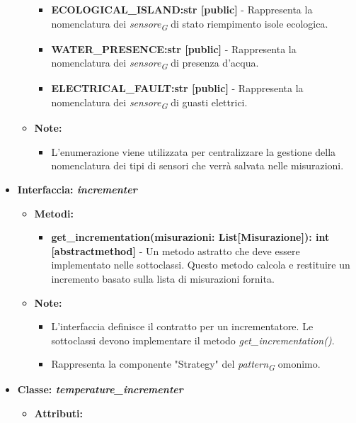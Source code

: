 \begin{itemize}
\begin{itemize}
\begin{itemize}
                \item \textbf{ECOLOGICAL\_ISLAND:str [public]} - Rappresenta la nomenclatura dei \textit{sensore}\textsubscript{\textit{G}} di stato riempimento isole ecologica.
                \item \textbf{WATER\_PRESENCE:str [public]} - Rappresenta la nomenclatura dei \textit{sensore}\textsubscript{\textit{G}} di presenza d'acqua.
                \item \textbf{ELECTRICAL\_FAULT:str [public]} - Rappresenta la nomenclatura dei \textit{sensore}\textsubscript{\textit{G}} di guasti elettrici.
            \end{itemize}

            \item \textbf{Note:}
            \begin{itemize}
                \item L'enumerazione viene utilizzata per centralizzare la gestione della nomenclatura dei tipi di sensori che verrà salvata nelle misurazioni.
            \end{itemize}
        \end{itemize}
\item \textbf{Interfaccia: \textit{incrementer}}
    \begin{itemize}
    \item \textbf{Metodi: }
    \begin{itemize}
        \item \textbf{get\_incrementation(misurazioni: List[Misurazione]): int [abstractmethod]} - Un metodo astratto che deve essere implementato nelle sottoclassi. Questo metodo calcola e restituire un incremento basato sulla lista di misurazioni fornita.
    \end{itemize}
    \item\textbf{Note:}
        \begin{itemize}
            \item L'interfaccia definisce il contratto per un incrementatore. Le sottoclassi devono implementare il metodo \textit{get\_incrementation()}.
            \item Rappresenta la componente "Strategy" del \textit{pattern}\textsubscript{\textit{G}} omonimo.
        \end{itemize}
    \end{itemize}
    \item \textbf{Classe: \textit{temperature\_incrementer}}
    \begin{itemize}
    \item \textbf{Attributi:}

\end{itemize}
\end{itemize}

